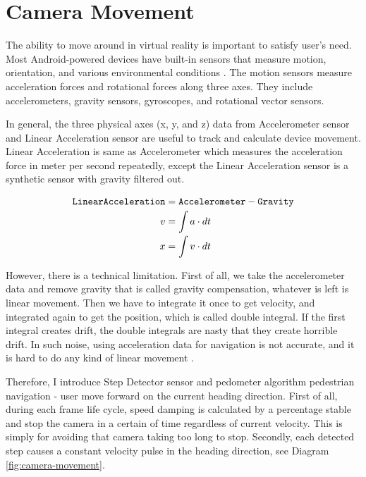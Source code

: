 \section{Camera Movement}

The ability to move around in virtual reality is important to satisfy user's need. Most Android-powered devices have built-in sensors that measure motion, orientation, and various environmental conditions \cite{google.sensors.2016}. The motion sensors measure acceleration forces and rotational forces along three axes. They include accelerometers, gravity sensors, gyroscopes, and rotational vector sensors. 

In general, the three physical axes (x, y, and z) data from Accelerometer sensor and Linear Acceleration sensor are useful to track and calculate device movement. Linear Acceleration is same as Accelerometer which measures the acceleration force in meter per second repeatedly, except the Linear Acceleration sensor is a synthetic sensor with gravity filtered out. 

\[
\begin{array}{lr}
\begin{aligned}
\texttt{LinearAcceleration} &= \texttt{Accelerometer} - \texttt{Gravity}\\
v &= \int a \cdot dt\\
x &= \int v \cdot dt\\
\end{aligned}
\end{array}
\]

However, there is a technical limitation. First of all, we take the accelerometer data and remove gravity that is called gravity compensation, whatever is left is linear movement. Then we have to integrate it once to get velocity, and integrated again to get the position, which is called double integral. If the first integral creates drift, the double integrals are nasty that they create horrible drift. In such noise, using acceleration data for navigation is not accurate, and it is hard to do any kind of linear movement \cite{google.sensor-fusion.2010}.

Therefore, I introduce Step Detector sensor and pedometer algorithm pedestrian navigation - user move forward on the current heading direction. First of all, during each frame life cycle, speed damping is calculated by a percentage stable and stop the camera in a certain of time regardless of current velocity. This is simply for avoiding that camera taking too long to stop. Secondly, each detected step causes a constant velocity pulse in the heading direction, see Diagram \ref{fig:camera-movement}.

